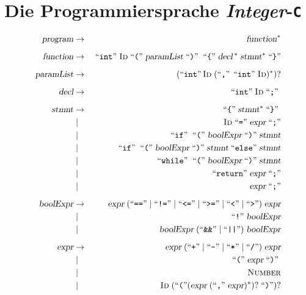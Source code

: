 \section{Die Programmiersprache \textsl{Integer}-\texttt{C}}

\begin{figure}[!ht]
  \begin{center}
  \begin{minipage}[t]{12.5cm}
  \begin{eqnarray*}    
\textsl{program}      & \rightarrow & \;\textsl{function}^* \\[0.2cm]
\textsl{function}     & \rightarrow & \;\mbox{``\texttt{int}''}\; \textsc{Id} \;\mbox{``\texttt{(}''}\; \textsl{paramList} \;\mbox{``\texttt{)}''}\; \;\mbox{``\texttt{\{}''}\; \textsl{decl}\,^*\; \textsl{stmnt}^* \;\mbox{``\texttt{\}}''} \\[0.2cm]
\textsl{paramList}    & \rightarrow & \;(\mbox{``\texttt{int}''}\, \textsc{Id}\; (\mbox{``\texttt{,}''}\, \;\mbox{``\texttt{int}''}\; \textsc{Id})^*)?  \\[0.2cm]
\textsl{decl}  & \rightarrow & \;\mbox{``\texttt{int}''}\; \textsc{Id} \;\mbox{``\texttt{;}''}\;  \\[0.2cm]
\textsl{stmnt}    & \rightarrow & \;\mbox{``\texttt{\{}''}\; \textsl{stmnt}^* \;\mbox{``\texttt{\}}''}\;  \\[0.0cm]
                      & \mid        & \;\textsc{Id} \;\mbox{``\texttt{=}''}\; \textsl{expr} \;\mbox{``\texttt{;}''} \\[0.0cm]
                      & \mid        &  \;\mbox{``\texttt{if}''}\; \;\mbox{``\texttt{(}''}\; \textsl{boolExpr} \;\mbox{``\texttt{)}''}\; \textsl{stmnt} \\[0.0cm]
                     & \mid         &  \;\mbox{``\texttt{if}''}\; \;\mbox{``\texttt{(}''}\; \textsl{boolExpr} \;\mbox{``\texttt{)}''}\; \textsl{stmnt} \;\mbox{``\texttt{else}''}\; \textsl{stmnt} \\[0.0cm]
                     & \mid        &  \;\mbox{``\texttt{while}''}\; \;\mbox{``\texttt{(}''}\; \textsl{boolExpr} \;\mbox{``\texttt{)}''}\; \textsl{stmnt} \\[0.0cm]
                     & \mid        &  \;\mbox{``\texttt{return}''}\; \textsl{expr}\; \mbox{``\texttt{;}''} \\[0.0cm]
                     & \mid        &  \;\textsl{expr} \;\mbox{``\texttt{;}''}               \\[0.2cm]
   \textsl{boolExpr} & \rightarrow & \textsl{expr} \;(\mbox{``\texttt{==}''} \mid \mbox{``\texttt{!=}''} \mid \mbox{``\texttt{<=}''} \mid \mbox{``\texttt{>=}''} \mid \mbox{``\texttt{<}''} \mid \mbox{``\texttt{>}''})\;  \textsl{expr} \\
         & \mid        &  \;\mbox{``\texttt{!}''}\; \textsl{boolExpr}             \\[0.0cm]
         & \mid        &  \textsl{boolExpr} \;(\mbox{``\texttt{\&\&}''} \mid \mbox{``\texttt{||}''})\; \textsl{boolExpr}   \\[0.2cm]
 \textsl{expr} & \rightarrow & \textsl{expr} \;(\mbox{``\texttt{+}''} \mid \mbox{``\texttt{-}''} \mid \mbox{``\texttt{*}''} \mid \mbox{``\texttt{/}''})\; \textsl{expr} \\[0.0cm]
     & \mid        &  \;\mbox{``\texttt{(}''}\; \textsl{expr} \;\mbox{``\texttt{)}''}\;                 \\[0.0cm]
     & \mid        &  \textsc{Number}                             \\[0.0cm]
     & \mid        &  \textsc{Id}\; (\mbox{``\texttt{(}''} (\textsl{expr}\; (\mbox{``\texttt{,}''}\; \textsl{expr})^*)?\;\mbox{``\texttt{)}''})?  
  \end{eqnarray*}
  \vspace*{-0.5cm}


\end{minipage}
\end{center}
\end{figure}
